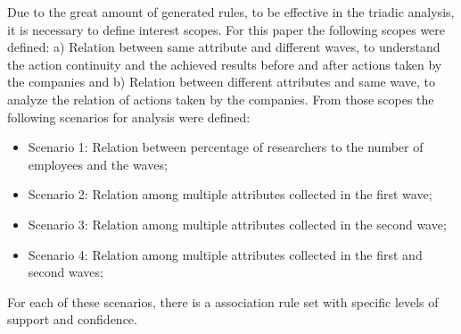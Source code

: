 \documentclass[a4paper,twoside]{article}
\begin{document}
Due to the great amount of generated rules, to be effective in the triadic analysis, it is necessary to define interest scopes. For this paper the following scopes were defined: a) Relation between same attribute and different waves, to understand the action continuity and the achieved results before and after actions taken by the companies and b) Relation between different attributes and same wave, to analyze the relation of actions taken by the companies. From those scopes the following scenarios for analysis were defined:

\begin{itemize}
    \item Scenario 1: Relation between percentage of researchers to the number of employees and the waves;
    \item Scenario 2: Relation among multiple attributes collected in the first wave;
    \item Scenario 3: Relation among multiple attributes collected in the second wave;
    \item Scenario 4: Relation among multiple attributes collected in the first and second waves;
\end{itemize}

For each of these scenarios, there is a association rule set with specific levels of support and confidence.
\end{document}
